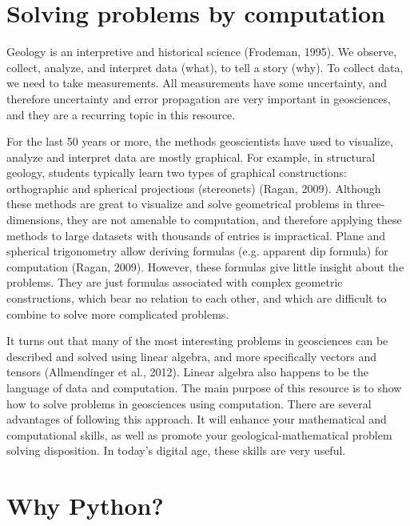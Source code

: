 \documentclass[a4paper , 12pt]{book}
\begin{document}
\section{Solving problems by computation}

Geology is an interpretive and historical science (Frodeman, 1995). We observe, collect, analyze, and interpret data (what), to tell a story (why). To collect data, we need to take measurements. All measurements have some uncertainty, and therefore uncertainty and error propagation are very important in geosciences, and they are a recurring topic in this resource.

For the last 50 years or more, the methods geoscientists have used to visualize, analyze and interpret data are mostly graphical. For example, in structural geology, students typically learn two types of graphical constructions: orthographic and  spherical projections (stereonets) (Ragan, 2009). Although these methods are great to visualize and solve geometrical problems in three-dimensions, they are not amenable to computation, and therefore applying these methods to large datasets with thousands of entries is impractical. Plane and spherical trigonometry allow deriving formulas (e.g. apparent dip formula) for computation (Ragan, 2009). However, these formulas give little insight about the problems. They are just formulas associated with complex geometric constructions, which bear no relation to each other, and which are difficult to combine to solve more complicated problems.

It turns out that many of the most interesting problems in geosciences can be described and solved using linear algebra, and more specifically vectors and tensors (Allmendinger et al., 2012). Linear algebra also happens to be the language of data and computation. The main purpose of this resource is to show how to solve problems in geosciences using computation. There are several advantages of following this approach. It will enhance your mathematical and computational skills, as well as promote your geological-mathematical problem solving disposition. In today’s digital age, these skills are very useful.

\section{Why Python?}
\end{document}
